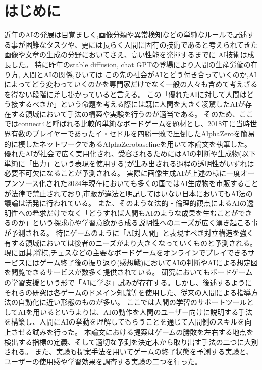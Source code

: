 \chapter{はじめに}
近年のAIの発展は目覚ましく,画像分類や異常検知などの単純なルールで記述する事が困難なタスクや、更には長らく人間に固有の技術であると考えられてきた画像や文章の生成\cite{oord2016wavenet}の分野においてさえ、高い性能を発揮するまでに
AI技術は成長した。
特に昨年のstable diffusion\cite{oord2016wavenet}, chat GPT\cite{oord2016wavenet}の登場により人間の生産労働の在り方, 人間とAIの関係,ひいては
この先の社会がAIとどう付き合っていくのか,AIによってどう変わっていくのかを専門家だけでなく一般の人々も含めて考えざるを得ない段階に差し掛かっていると言える。
この「優れたAIに対して人間はどう接するべきか」という命題を考える際には既に人間を大きく凌駕したAIが存在する領域において手法の構築や実験を行うのが適当である。
そのため、ここではconnect4と呼ばれる比較的単純なボードゲームを題材とし、2018年に当時世界有数のプレイヤーであったイ・セドルを四勝一敗で圧倒したAlphaZero\cite{oord2016wavenet}を簡易的に模したネットワークであるAlphaZerobaseline\cite{oord2016wavenet}を用いて本論文を執筆した。
優れたAIが社会で広く実用化され、受容されるためにはAIの判断や生成物(以下単純に「出力」という表現を使用する)が生み出される過程の透明性がいずれは必要不可欠になることが予測される。
実際に画像生成AIが上述の様に一度オープンソース化された2024年現在においても多くの国ではAI生成物を市販することが法律で禁止されており\cite{oord2016wavenet},市販が違法と明記してはいない日本においてもAI法の議論は活発に行われている。
また、そのような法的・倫理的観点によるAIの透明性への希求だけでなく「どうすれば人間もAIのような成果を生むことができるのか」という探求心や学習意欲から成る説明性へのニーズが広く湧き起こる事が予測される。
特にゲームのように「AI対人間」と表現すべき対立構造を強く有する領域においては後者のニーズがより大きくなっていくものと予測される。
現に囲碁,将棋,チェスなどの主要なボードゲームをオンラインでプレイできるサービスにはゲーム終了後の振り返り(感想戦)においてAIの判断やAIによる想定図を閲覧できるサービスが数多く提供されている。
研究においてもボードゲームの学習支援という形で「AIに学ぶ」試みが存在する。しかし、後述するようにそれらの研究は各ゲームのドメイン知識等を使用した、従来の人間による指導方法の自動化に近い形態のものが多い。
ここでは人間の学習のサポートツールとしてAIを用いるというよりは、AIの動作を人間のユーザー向けに説明する手法を構築し、人間にAIの挙動を理解してもらうことを通じて人間側のスキルを向上させる試みを行った。
本論文における提案はゲームの勝敗を左右する地点を検出する指標の定義、そして適切な予測を決定木から取り出す手法の二つに大別される。
また、実験も提案手法を用いてゲームの終了状態を予測する実験と、ユーザーの使用感や学習効果を調査する実験の二つを行った。